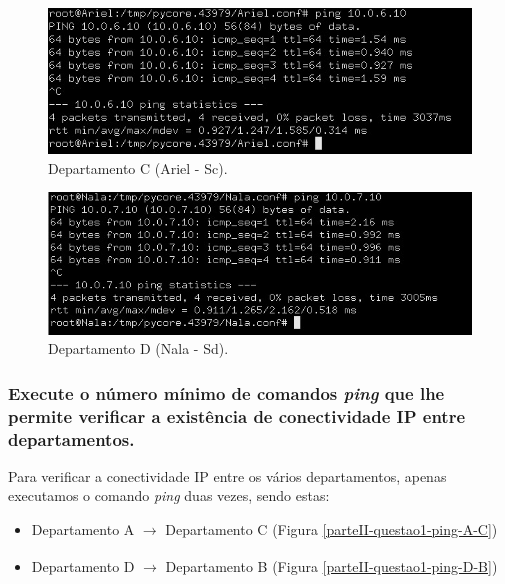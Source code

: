     \begin{minipage}{0.5\linewidth}
    \centering
         \begin{figure}[H]
        \includegraphics[width=\linewidth]{images/ParteII/Questao1/parteII-questao1-d-Ariel.jpg}
        \caption{Departamento C (Ariel - Sc).} \label{parteII-questao1-ping-Ariel-SC}
        \end{figure}
    \end{minipage}
    \begin{minipage}{0.5\linewidth}
    \centering
        \begin{figure}[H]
        \includegraphics[width=\linewidth]{images/ParteII/Questao1/parteII-questao1-d-Nala.jpg}
        \caption{Departamento D (Nala - Sd).} \label{parteII-questao1-ping-Nala-SD}
        \end{figure}    
    \end{minipage}
    
    
    
    
    
    
\subsubsection{Execute o número mínimo de comandos \textit{\textbf{ping}} que lhe permite verificar a existência de conectividade IP entre departamentos.}

    \par Para verificar a conectividade IP entre os vários departamentos, apenas executamos o comando \textit{ping} duas vezes, sendo estas: 
    
        \begin{itemize}
            \item Departamento A $\xrightarrow[]{}$ Departamento C (Figura \ref{parteII-questao1-ping-A-C})
            
            \item Departamento D $\xrightarrow[]{}$ Departamento B (Figura \ref{parteII-questao1-ping-D-B})
        \end{itemize}
    
